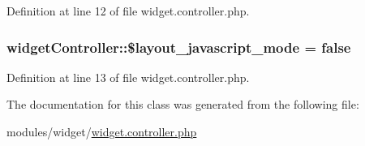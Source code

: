 Definition at line 12 of file widget.\+controller.\+php.

\subsubsection[{\texorpdfstring{\$layout\+\_\+javascript\+\_\+mode}{$layout_javascript_mode}}]{\setlength{\rightskip}{0pt plus 5cm}widget\+Controller\+::\$layout\+\_\+javascript\+\_\+mode = false}\hypertarget{classwidgetController_ab123ebb549e616c6e67bf79e73f56ac8}{}\label{classwidgetController_ab123ebb549e616c6e67bf79e73f56ac8}


Definition at line 13 of file widget.\+controller.\+php.



The documentation for this class was generated from the following file\+:\begin{DoxyCompactItemize}
\item 
modules/widget/\hyperlink{widget_8controller_8php}{widget.\+controller.\+php}\end{DoxyCompactItemize}
